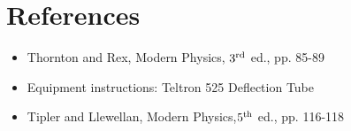 \documentclass{article}
\begin{document}
\section{References}
\begin{itemize}
\item Thornton and Rex, Modern Physics, $3^{\rm rd}$ ed., pp. 85-89
\item Equipment instructions: Teltron 525 Deflection Tube
\item Tipler and Llewellan, Modern Physics,$5^{\rm th}$ ed., pp. 116-118
\end{itemize}
\end{document}
